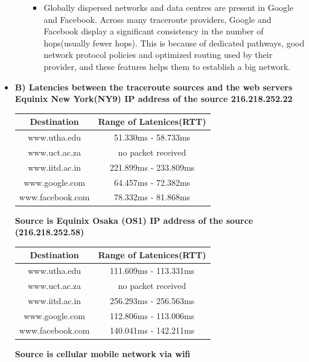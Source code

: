 \documentclass{article}
\begin{document}
\begin{itemize}
\begin{itemize}
\begin{itemize}
        \item Globally dispersed networks and data centres are present in Google and Facebook. Across many traceroute providers, Google and Facebook display a significant consistency in the number of hops(usually fewer hops). This is because of dedicated pathways, good network protocol policies and optimized routing used by their provider, and these features helps them to establish a big network.
    \end{itemize}          
    
\end{itemize}
\item  \textbf{B) Latencies between the traceroute sources and the web servers} \\
  \textbf{Equinix New York(NY9) IP address of the source  216.218.252.22}
    \begin{center}
\begin{tabular}{|c|c|}
    \hline
     Destination & Range of Latenices(RTT) \\
    \hline
    www.utha.edu & 51.330ms - 58.733ms  \\
    \hline
    www.uct.ac.za &  no packet received \\
    \hline
    www.iitd.ac.in & 221.899ms -  233.809ms  \\
    \hline  
    www.google.com  &  64.457ms - 72.382ms \\ 
    \hline
    www.facebook.com & 78.332ms - 81.868ms \\  
    \hline
    \end{tabular}
\end{center}
\textbf{ Source is Equinix Osaka (OS1) IP address of the source (216.218.252.58)}
    \begin{center}
\begin{tabular}{|c|c|}
    \hline
     Destination & Range of Latenices(RTT) \\
    \hline
    www.utha.edu & 111.609ms - 113.331ms \\
    \hline
    www.uct.ac.za & no packet received \\
    \hline
    www.iitd.ac.in & 256.293ms - 256.563ms  \\
    \hline  
    www.google.com  & 112.806ms - 113.006ms \\ 
    \hline
    www.facebook.com & 140.041ms - 142.211ms \\  
    \hline
    \end{tabular}
\end{center}
\textbf{Source is cellular mobile network via wifi  }

\end{itemize}
\end{document}
